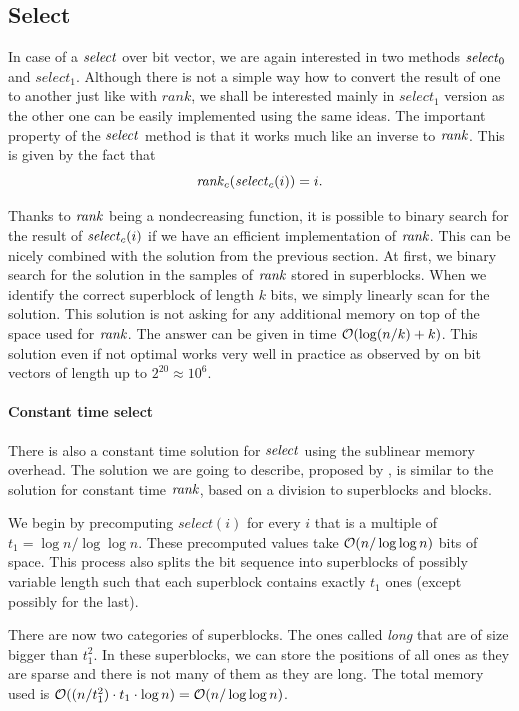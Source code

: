 \subsection{Select}
\label{section:select}

In case of a $\mathit{select}$ over bit vector, we are again interested in two methods $\mathit{select}_0$
and $select_1$. Although there is not a simple way how to convert the result of one to
another just like with $rank$, we shall be interested mainly in $select_1$ version as the
other one can be easily implemented using the same ideas. The important property of the
$\mathit{select}$ method is that it works much like an inverse to $\mathit{rank}$. This is given by the fact that
$$\mathit{rank}_c(\mathit{select}_c(i)) = i.$$

Thanks to $\mathit{rank}$ being a nondecreasing function, it is possible
to binary search for the result of $\mathit{select}_c(i)$ if we have an efficient implementation of
$\mathit{rank}$. This can be nicely combined with the solution from the previous section.
At first, we binary search for the solution in the samples of $\mathit{rank}$ stored in superblocks. When we
identify the correct superblock of length $k$ bits, we simply linearly scan for the solution. This
solution is not asking for any additional memory on top of the space used for $\mathit{rank}$. The answer
can be given in time $\mathcal{O}(\log(n/k)+k)$. This solution even if not optimal works very well in
practice as observed by \cite{gonzalez2005practical} on bit vectors of length up to $2^20\approx 10^6$.

\paragraph{Constant time select}

There is also a constant time solution for $\mathit{select}$ using the sublinear memory overhead.
The solution we are going to describe, proposed by \cite{clark1997compact}, is similar to
the solution for constant time $\mathit{rank}$, based on a division to superblocks and blocks.

We begin by precomputing $select(i)$ for every $i$ that is a
multiple of $t_1=\log n/\log\log n$. These precomputed values take $\mathcal{O}(n/\log\log n)$ bits of space.
This process also splits the bit sequence into superblocks of possibly variable length such that
each superblock contains exactly $t_1$ ones (except possibly for the last).

There are now two categories of superblocks. The ones called \textit{long} that are of size bigger
than $t_1^2$. In these superblocks, we can store the positions of all ones as they are sparse
and there is not many of them as they are long. The total memory used is $\mathcal{O}((n/t_1^2)\cdot t_1\cdot
\log n) = \mathcal{O}(n/\log\log n)$.

